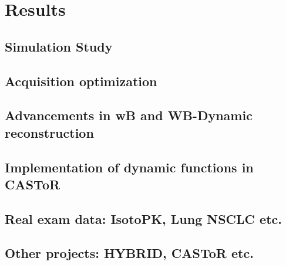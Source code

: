 \chapter{Results}

\section{Simulation Study}

\section{Acquisition optimization}

\section{Advancements in wB and WB-Dynamic reconstruction}

\section{Implementation of dynamic functions in CASToR }

\section{Real exam data: IsotoPK, Lung NSCLC etc.}

\section{Other projects: HYBRID, CASToR etc.}

